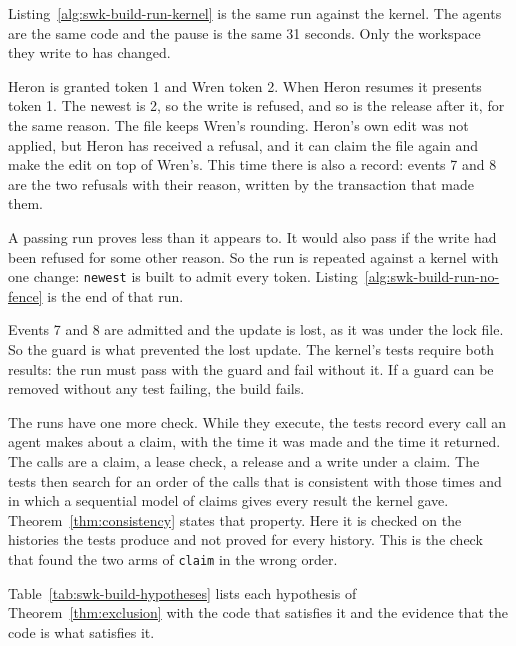 Listing~\ref{alg:swk-build-run-kernel} is the same run against the kernel. The
agents are the same code and the pause is the same 31 seconds. Only the
workspace they write to has changed.


Heron is granted token 1 and Wren token 2. When Heron resumes it presents
token 1. The newest is 2, so the write is refused, and so is the release
after it, for the same reason. The file keeps Wren's rounding. Heron's own
edit was not applied, but Heron has received a refusal, and it can claim the
file again and make the edit on top of Wren's. This time there is also a
record: events 7 and 8 are the two refusals with their reason, written by
the transaction that made them.

A passing run proves less than it appears to. It would also pass if the
write had been refused for some other reason. So the run is repeated against
a kernel with one change: \texttt{newest} is built to admit every token.
Listing~\ref{alg:swk-build-run-no-fence} is the end of that run.


Events 7 and 8 are admitted and the update is lost, as it was under the
lock file. So the guard is what prevented the lost update. The kernel's tests
require both results: the run must pass with the guard and fail without it.
If a guard can be removed without any test failing, the build fails.

The runs have one more check. While they execute, the tests record every
call an agent makes about a claim, with the time it was made and the time it
returned. The calls are a claim, a lease check, a release and a write under
a claim. The tests then search for an order of the calls that is consistent
with those times and in which a sequential model of claims gives every
result the kernel gave. Theorem~\ref{thm:consistency} states that property.
Here it is checked on the histories the tests produce and not proved for
every history. This is the check that found the two arms of \texttt{claim}
in the wrong order.

Table~\ref{tab:swk-build-hypotheses} lists each hypothesis of
Theorem~\ref{thm:exclusion} with the code that satisfies it and the evidence
that the code is what satisfies it.

